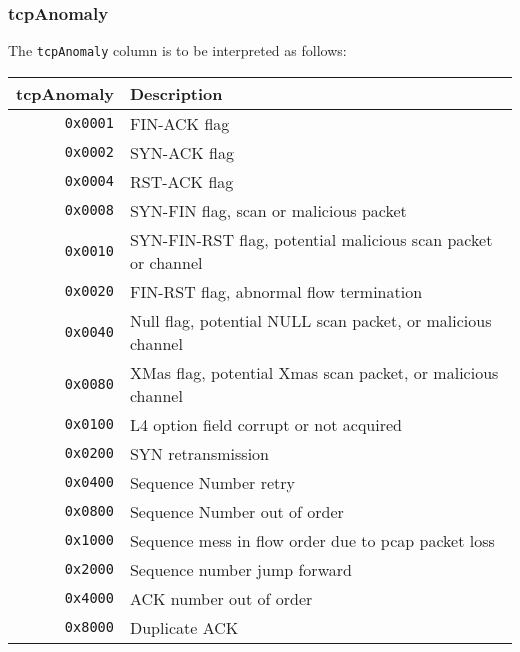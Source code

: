 \documentclass[documentation]{subfiles}
\begin{document}
\subsubsection{tcpAnomaly}\label{tcpAnomaly}
The {\tt tcpAnomaly} column is to be interpreted as follows:
\begin{longtable}{rl}
    \toprule
    {\bf tcpAnomaly} & {\bf Description}\\
    \midrule\endhead%
    {\tt 0x0001} & FIN-ACK flag\\
    {\tt 0x0002} & SYN-ACK flag\\
    {\tt 0x0004} & RST-ACK flag\\
    {\tt 0x0008} & SYN-FIN flag, scan or malicious packet\\
    {\tt 0x0010} & SYN-FIN-RST flag, potential malicious scan packet or channel\\
    {\tt 0x0020} & FIN-RST flag, abnormal flow termination\\
    {\tt 0x0040} & Null flag, potential NULL scan packet, or malicious channel\\
    {\tt 0x0080} & XMas flag, potential Xmas scan packet, or malicious channel\\
    {\tt 0x0100} & L4 option field corrupt or not acquired\\
    {\tt 0x0200} & SYN retransmission\\
    {\tt 0x0400} & Sequence Number retry\\
    {\tt 0x0800} & Sequence Number out of order\\
    {\tt 0x1000} & Sequence mess in flow order due to pcap packet loss\\
    {\tt 0x2000} & Sequence number jump forward\\
    {\tt 0x4000} & ACK number out of order\\
    {\tt 0x8000} & Duplicate ACK\\
    \bottomrule
\end{longtable}
\end{document}
